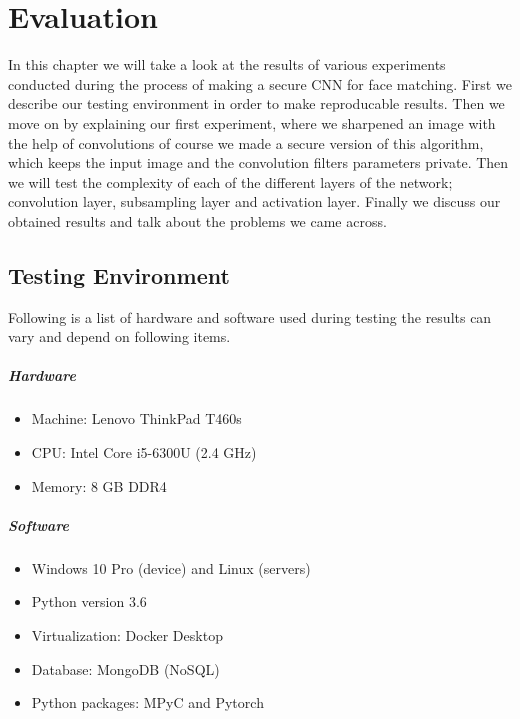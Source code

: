 \chapter{Evaluation}
\label{chapter:evaluation}

In this chapter we will take a look at the results of various experiments conducted during the process of making a secure CNN for face matching. First we describe our testing environment in order to make reproducable results. Then we move on by explaining our first experiment, where we sharpened an image with the help of convolutions of course we made a secure version of this algorithm, which keeps the input image and the convolution filters parameters private. Then we will test the complexity of each of the different layers of the network; convolution layer, subsampling layer and activation layer. Finally we discuss our obtained results and talk about the problems we came across.

\section{Testing Environment}
Following is a list of hardware and software used during testing the results can vary and depend on following items.

\paragraph{Hardware}
\begin{itemize}
  \item Machine: Lenovo ThinkPad T460s
  \item CPU: Intel Core i5-6300U (2.4 GHz)
  \item Memory: 8 GB DDR4
\end{itemize}

\paragraph{Software}
\begin{itemize}
  \item Windows 10 Pro (device) and Linux (servers)
  \item Python version 3.6
  \item Virtualization: Docker Desktop
  \item Database: MongoDB (NoSQL)
  \item Python packages: MPyC and Pytorch
\end{itemize}

